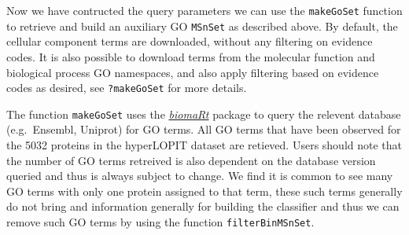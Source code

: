 \begin{Shaded}
\begin{Highlighting}[]
\StringTok{ }\NormalTok{(} \NormalTok{(}\NormalTok{, }
                                      \NormalTok{))}
\end{Highlighting}
\end{Shaded}

Now we have contructed the query parameters we can use the
\texttt{makeGoSet} function to retrieve and build an auxiliary GO
\texttt{MSnSet} as described above. By default, the cellular component
terms are downloaded, without any filtering on evidence codes. It is
also possible to download terms from the molecular function and
biological process GO namespaces, and also apply filtering based on
evidence codes as desired, see \texttt{?makeGoSet} for more details.

\begin{Shaded}
\begin{Highlighting}[]
\StringTok{ } 
                   \NormalTok{, }
                   \NormalTok{)}
\end{Highlighting}
\end{Shaded}

The function \texttt{makeGoSet} uses the
\emph{\href{http://bioconductor.org/packages/biomaRt}{biomaRt}} package
to query the relevent database (e.g.~Ensembl, Uniprot) for GO terms. All
GO terms that have been observed for the 5032 proteins in the hyperLOPIT
dataset are retieved. Users should note that the number of GO terms
retreived is also dependent on the database version queried and thus is
always subject to change. We find it is common to see many GO terms with
only one protein assigned to that term, these such terms generally do
not bring and information generally for building the classifier and thus
we can remove such GO terms by using the function
\texttt{filterBinMSnSet}.

\begin{Shaded}
\begin{Highlighting}[]
\StringTok{ }
\end{Highlighting}
\end{Shaded}

